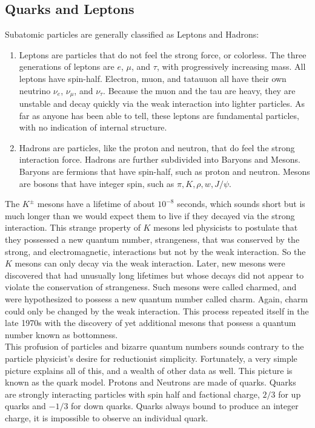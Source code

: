 \documentclass[11pt]{article}
\theoremstyle{break}
\theoremstyle{break}
\begin{document}
\subsection{Quarks and Leptons}
Subatomic particles are generally classified as Leptons and Hadrons:
\begin{enumerate}
\item Leptons are particles that do not feel the strong force, or colorless. The three generations of leptons are $e$, $\mu$, and $\tau$, with progressively increasing mass. All leptons have spin-half. Electron, muon, and tatauuon all have their own neutrino $\nu_e$, $\nu_\mu$, and $\nu_\tau$. Because the muon and the tau are heavy, they are unstable and decay quickly via the weak interaction into lighter particles. As far as anyone has been able to tell, these leptons are fundamental particles, with no
indication of internal structure.
\item Hadrons are particles, like the proton and neutron, that do feel the strong interaction force. Hadrons are further subdivided into Baryons and Mesons. Baryons are fermions that have spin-half, such as proton and neutron. Mesons are bosons that have integer spin, such as $\pi, K, \rho, w, J/\psi$.
\end{enumerate}


The $K^\pm$ mesons have a lifetime of about $10^{-8}$ seconds, which sounds short but is much longer than we would
expect them to live if they decayed via the strong interaction. This strange property of $K$ mesons led physicists to postulate that they possessed a new quantum number, strangeness, that
was conserved by the strong, and electromagnetic, interactions but not by the weak interaction. So the $K$ mesons can only decay via the weak interaction.  Later, new mesons were discovered that had unusually long lifetimes but whose decays did not appear to violate the conservation of strangeness. Such mesons were called charmed, and were hypothesized to possess a new quantum number called charm. Again, charm could only be changed by the weak interaction. This process repeated itself in the late 1970s with the discovery
of yet additional mesons that possess a quantum number known as bottomness.\\

This profusion of particles and bizarre quantum numbers sounds contrary to the particle physicist's desire for reductionist simplicity. Fortunately, a very simple picture explains all of this, and a wealth of other data as well. This picture is known as the quark model. Protons and Neutrons are made of quarks. Quarks are strongly interacting particles with spin half and factional charge, $2/3$ for up quarks and $-1/3$ for down quarks. Quarks always bound to produce an integer charge, it is impossible to observe an individual quark.\\
\end{document}
